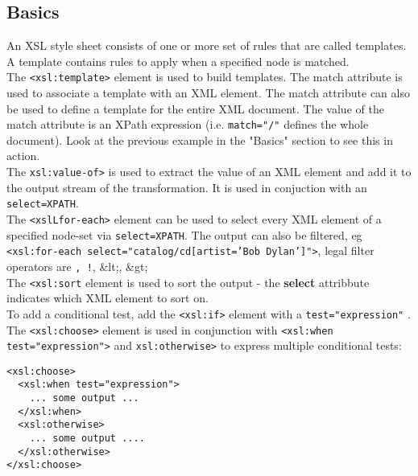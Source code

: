 \documentclass[11pt]{article}
\begin{document}
\subsection{Basics}
\label{sec:orgf06dd25}
An XSL style sheet consists of one or more set of rules that are called templates. A template contains rules to apply when a specified node is matched.\\
The \texttt{<xsl:template>} element is used to build templates.
The match attribute is used to associate a template with an XML element. The match attribute can also be used to define a template for the entire XML document. The value of the match attribute is an XPath expression (i.e. \texttt{match="/"} defines the whole document). Look at the previous example in the "Basics" section to see this in action.\\
The \texttt{xsl:value-of>} is used to extract the value of an XML element and add it to the output stream of the transformation. It is used in conjuction with an \texttt{select=XPATH}.\\
The \texttt{<xslLfor-each>} element can be used to select every XML element of a specified node-set via \texttt{select=XPATH}. The output can also be filtered, eg \texttt{<xsl:for-each select="catalog/cd[artist='Bob Dylan']">}, legal filter operators are \texttt{, !}, \&lt;, \&gt; \\
The \texttt{<xsl:sort} element is used to sort the output - the \textbf{select} attribbute indicates which XML element to sort on.\\
To add a conditional test, add the \texttt{<xsl:if>} element with a \texttt{test="expression"} . The \texttt{<xsl:choose>} element is used in conjunction with \texttt{<xsl:when test="expression">} and \texttt{xsl:otherwise>} to express multiple conditional tests:
\lstset{breaklines=true,language=XML,label= ,caption= ,captionpos=b,numbers=none}
\begin{lstlisting}
<xsl:choose>
  <xsl:when test="expression">
    ... some output ...
  </xsl:when>
  <xsl:otherwise>
    ... some output ....
  </xsl:otherwise>
</xsl:choose>
\end{lstlisting}
\end{document}
